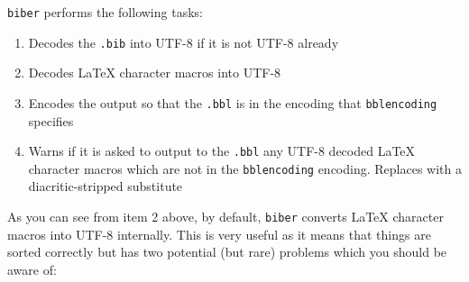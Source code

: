 \documentclass{ltxdockit}
\begin{document}
\noindent \verb+biber+ performs the following tasks:

\begin{enumerate}
\item Decodes the \verb+.bib+ into UTF-8 if it is not UTF-8 already
\item Decodes LaTeX character macros into UTF-8
\item Encodes the output so that the \verb+.bbl+ is in
  the encoding that \verb+bblencoding+ specifies
\item Warns if it is asked to output to the \verb+.bbl+ any UTF-8
  decoded LaTeX character macros which are not in the
  \verb+bblencoding+ encoding. Replaces with a diacritic-stripped substitute
\end{enumerate}

\noindent As you can see from item 2 above, by default, \verb+biber+
converts LaTeX character macros into UTF-8 internally. This is very
useful as it means that things are sorted correctly but has two
potential (but rare) problems which you should be aware of:
\end{document}

